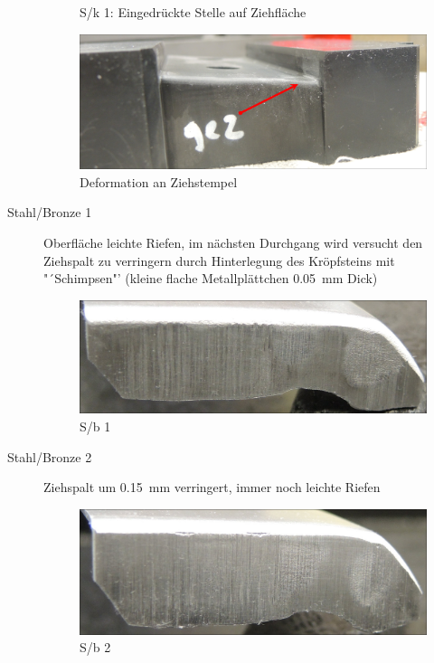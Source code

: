 \documentclass[12pt,a4paper,parskip]{scrartcl}
\begin{document}
\begin{description}
\begin{figure}[H]
\caption{S/k 1: Eingedrückte Stelle auf Ziehfläche}
\label{fig:sk1}
\end{figure}
\begin{figure}[H]
\centering
\includegraphics[width=.8\textwidth]{PunchDefektGut}
\caption{Deformation an Ziehstempel}
\label{fig:punchdefect}
\end{figure}
\item[Stahl/Bronze 1] Oberfläche leichte Riefen, im nächsten Durchgang wird versucht den Ziehspalt zu verringern durch Hinterlegung des Kröpfsteins mit "´Schimpsen"' (kleine flache Metallplättchen  \SI{0.05}{\milli\meter} Dick)
\begin{figure}[H]
\centering
\includegraphics[width=.8\textwidth]{Sb1a}
\caption{S/b 1}
\label{fig:sb1}
\end{figure}
\item[Stahl/Bronze 2] Ziehspalt um \SI{0.15}{\milli\meter} verringert, immer noch leichte Riefen
\begin{figure}[H]
\centering
\includegraphics[width=.8\textwidth]{Sb2}
\caption{S/b 2 }
\label{sb2}
\end{figure}








\end{description}
\end{document}
